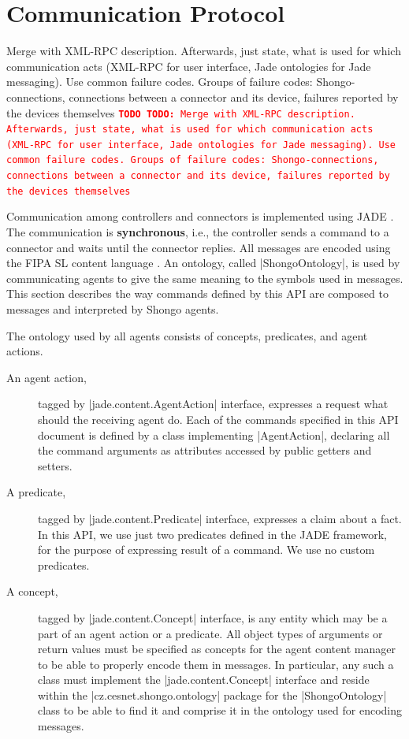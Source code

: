\documentclass[a4paper]{report}
\newcommand{\TODO}[1]{%
\def\empty{}%
\def\prvniparametr{#1}%
\ifx\prvniparametr\empty%
\begingroup\tt\textcolor{red}{\noindent\textbf{TODO}}\endgroup
\else%
\begingroup\tt\textcolor{red}{\noindent\textbf{TODO:}\ #1}\endgroup
\fi%
}
\begin{document}
\section{Communication Protocol}

\TODO{Merge with XML-RPC description. Afterwards, just state, what is used for which communication acts (XML-RPC for user interface, Jade ontologies for Jade messaging). Use common failure codes. Groups of failure codes: Shongo-connections, connections between a connector and its device, failures reported by the devices themselves}

Communication among controllers and connectors is implemented using JADE \cite{jade}. The communication is \textbf{synchronous}, i.e., the controller sends a command to a connector and waits until the connector replies. All messages are encoded using the FIPA SL content language \cite{FIPA-SL}. An ontology, called |ShongoOntology|, is used by communicating agents to give the same meaning to the symbols used in messages. This section describes the way commands defined by this API are composed to messages and interpreted by Shongo agents.

The ontology used by all agents consists of concepts, predicates, and agent actions.
\begin{description}
\item[An agent action,] tagged by |jade.content.AgentAction| interface, expresses a request what should the receiving agent do. Each of the commands specified in this API document is defined by a class implementing |AgentAction|, declaring all the command arguments as attributes accessed by public getters and setters.
\item[A predicate,] tagged by |jade.content.Predicate| interface, expresses a claim about a fact. In this API, we use just two predicates defined in the JADE framework, for the purpose of expressing result of a command. We use no custom predicates.
\item[A concept,] tagged by |jade.content.Concept| interface, is any entity which may be a part of an agent action or a predicate. All object types of arguments or return values must be specified as concepts for the agent content manager to be able to properly encode them in messages. In particular, any such a class must implement the |jade.content.Concept| interface and reside within the |cz.cesnet.shongo.ontology| package for the |ShongoOntology| class to be able to find it and comprise it in the ontology used for encoding messages.
\end{description}
\end{document}
